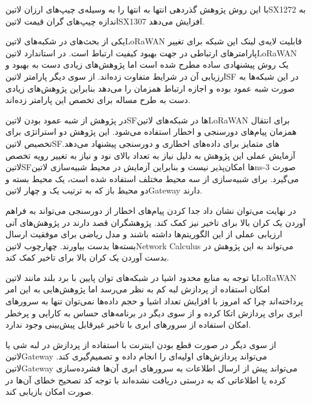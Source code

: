 با این روش پژوهش گذردهی انتها به انتها را به وسیله‌ی چیپ‌های ارزان ‌لاتین{SX1272} به اندازه چیپ‌های گران قیمت ‌لاتین{SX1307} افزایش می‌دهد.


یکی از بحث‌های در شکبه‌های ‌لاتین{LoRaWAN} قابلیت لایه‌ی لینک این شبکه برای تغییر پارامترهای ارتباطی در جهت بهبود کیفیت ارتباط است. در استاندارد ‌لاتین{LoRaWAN} یک روش پیشنهادی ساده مطرح شده است
اما پژوهش‌های زیادی دست به بهبود و ارزیابی آن در شرایط متفاوت زده‌اند. از سوی دیگر پارامتر ‌لاتین{SF} در این شبکه‌ها به صورت شبه عمود بوده و اجازه ارتباط همزمان را می‌دهد بنابراین پژوهش‌های زیادی دست به طرح مساله
برای تخصص این پارامتر زده‌اند.


در پژوهش  از شبه عمود بودن ‌لاتین{SF}ها در شبکه‌های ‌لاتین{LoRaWAN} برای انتقال همزمان پیام‌های دورسنجی و اخطار استفاده می‌شود.
این پژوهش دو استراتژی برای تخصیص ‌لاتین{SF}های متمایز برای داده‌های اخطاری و دورسنجی پیشنهاد می‌دهد.
آزمایش عملی این پژوهش به دلیل نیاز به تعداد بالای نود و نیاز به تغییر رویه تخصص ‌لاتین{SF}ها امکان‌پذیر نیست و بنابراین آزمایش در محیط شبیه‌سازی ‌لاتین{ns-3} صورت می‌گیرد.
برای شبیه‌سازی از سه محیط مختلف استفاده شده است، یک محیط بسته و دو محیط باز که به ترتیب یک و چهار ‌لاتین{Gateway} دارند.

در نهایت می‌توان نشان داد جدا کردن پیام‌های اخطار از دورسنجی می‌تواند به فراهم آوردن یک کران بالا برای تاخیر نیز کمک کند. پژوهشگران قصد دارند در پژوهش‌های آتی ارزیابی عملی از این الگوریتم‌ها داشته باشند
و مدل ریاضی برای موفقیت ارسال بسته‌ها بدست بیاورند. چهارچوب ‌لاتین{Network Calculus} می‌تواند به این پژوهش در بدست آوردن یک کران بالا برای تاخیر کمک کند.



با توجه به منابع محدود اشیا در شبکه‌های توان پایین با برد بلند مانند ‌لاتین{LoRaWAN} امکان استفاده از پردازش لبه کم به نظر می‌رسد اما پژوهش‌هایی به این امر پرداخته‌اند
چرا که امروز با افزایش تعداد اشیا و حجم داده‌ها نمی‌توان تنها به سرورهای ابری برای پردازش اتکا کرده و از سوی دیگر در برنامه‌های حساس به کارایی و پرخطر امکان استفاده از سرورهای
ابری با تاخیر غیرقابل پیش‌بینی وجود ندارد.

از سوی دیگر در صورت قطع بودن اینترنت با استفاده از پردازش در لبه شی یا ‌لاتین{Gateway} می‌تواند پردازش‌های اولیه‌ای را انجام داده و تصمیم‌گیری کند.
‌لاتین{Gateway} می‌تواند پیش از ارسال اطلاعات به سرورهای ابری آن‌ها فشرده‌سازی کرده یا اطلاعاتی که به درستی دریافت نشده‌اند با توجه کد تصحیح خطای آن‌ها
در صورت امکان بازیابی کند.

